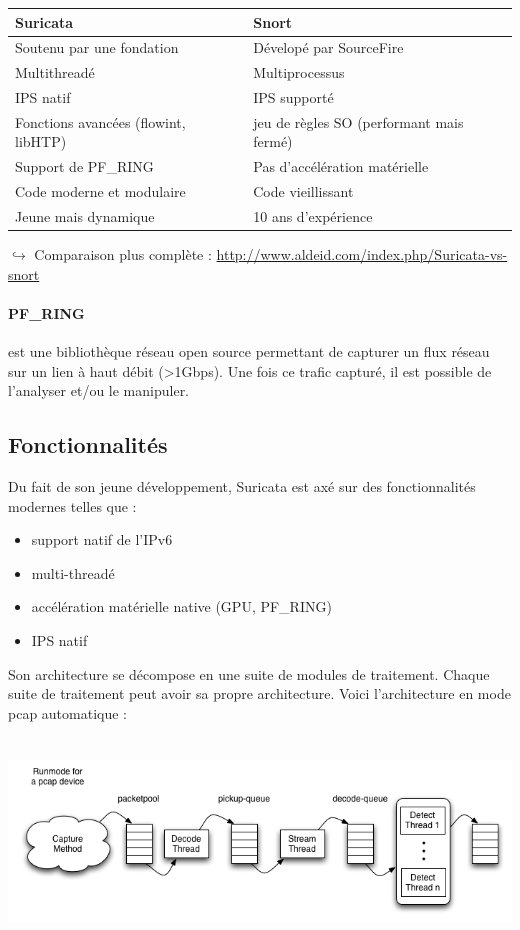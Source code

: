 \documentclass[a4paper,11pt,french]{article}
\begin{document}
\begin{center}
\begin{tabularx}{15cm}{|X|X|}
\hline
\textbf{Suricata}&\textbf{Snort}\\
\hline
Soutenu par une fondation  & Dévelopé par SourceFire\\
Multithreadé & Multiprocessus\\
IPS natif & IPS supporté\\
Fonctions avancées (flowint, libHTP) & jeu de règles SO (performant mais fermé)\\
Support de PF\_RING & Pas d'accélération matérielle\\
Code moderne et modulaire &  Code vieillissant\\
Jeune mais dynamique &  10 ans d'expérience\\
\hline
\end{tabularx}
\end{center}

$\hookrightarrow$ Comparaison plus complète : \url{http://www.aldeid.com/index.php/Suricata-vs-snort}


\paragraph{PF\_RING} est une bibliothèque réseau open source permettant de capturer un flux réseau sur un lien à haut débit (>1Gbps). Une fois ce trafic capturé, il est possible de l’analyser et/ou le manipuler.

\subsection{Fonctionnalités}

Du fait de son jeune développement, Suricata est axé sur des fonctionnalités modernes telles que :
\begin{itemize}
\item support natif de l’IPv6
\item multi-threadé
\item accélération matérielle native (GPU, PF\_RING)
\item IPS natif
\end{itemize}
\newpage
Son architecture se décompose en une suite de modules de traitement. Chaque suite de traitement peut avoir sa propre architecture. Voici l’architecture en mode pcap automatique :
\begin{center}
\includegraphics[height=5.5cm]{icons/suricata_pcap_auto_pipeline_v1.png}
\end{center}
\end{document}
